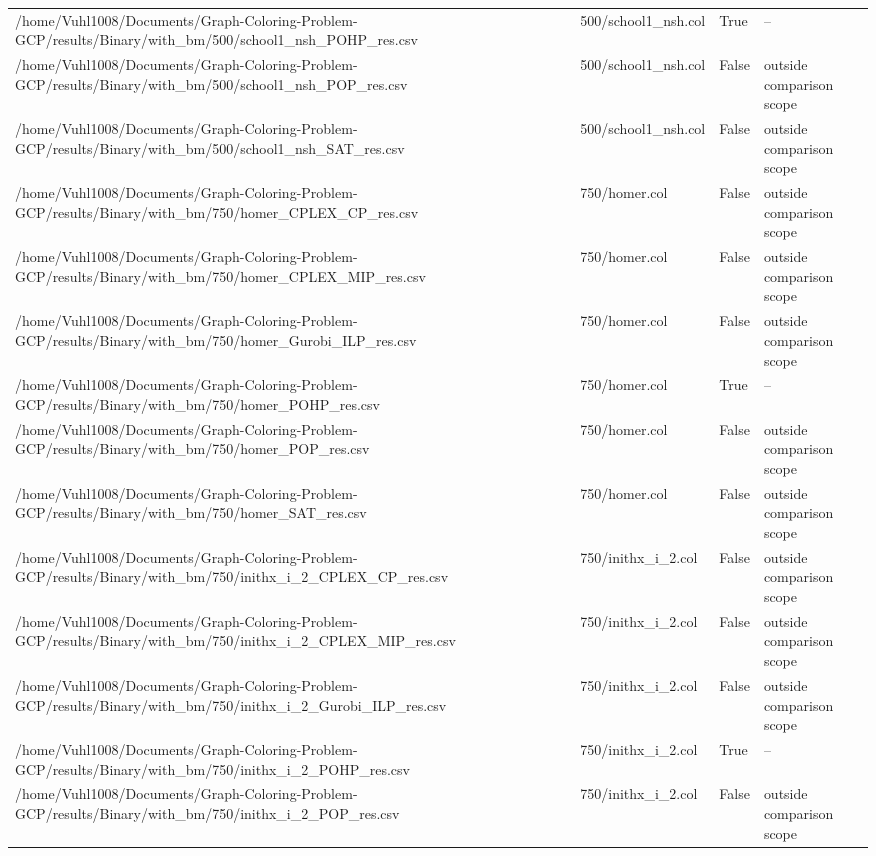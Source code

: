 \begin{table}[htbp]
\begin{tabular}{llll}
/home/Vuhl1008/Documents/Graph-Coloring-Problem-GCP/results/Binary/with\_bm/500/school1\_nsh\_POHP\_res.csv & 500/school1\_nsh.col & True & -- \\
/home/Vuhl1008/Documents/Graph-Coloring-Problem-GCP/results/Binary/with\_bm/500/school1\_nsh\_POP\_res.csv & 500/school1\_nsh.col & False & outside comparison scope \\
/home/Vuhl1008/Documents/Graph-Coloring-Problem-GCP/results/Binary/with\_bm/500/school1\_nsh\_SAT\_res.csv & 500/school1\_nsh.col & False & outside comparison scope \\
/home/Vuhl1008/Documents/Graph-Coloring-Problem-GCP/results/Binary/with\_bm/750/homer\_CPLEX\_CP\_res.csv & 750/homer.col & False & outside comparison scope \\
/home/Vuhl1008/Documents/Graph-Coloring-Problem-GCP/results/Binary/with\_bm/750/homer\_CPLEX\_MIP\_res.csv & 750/homer.col & False & outside comparison scope \\
/home/Vuhl1008/Documents/Graph-Coloring-Problem-GCP/results/Binary/with\_bm/750/homer\_Gurobi\_ILP\_res.csv & 750/homer.col & False & outside comparison scope \\
/home/Vuhl1008/Documents/Graph-Coloring-Problem-GCP/results/Binary/with\_bm/750/homer\_POHP\_res.csv & 750/homer.col & True & -- \\
/home/Vuhl1008/Documents/Graph-Coloring-Problem-GCP/results/Binary/with\_bm/750/homer\_POP\_res.csv & 750/homer.col & False & outside comparison scope \\
/home/Vuhl1008/Documents/Graph-Coloring-Problem-GCP/results/Binary/with\_bm/750/homer\_SAT\_res.csv & 750/homer.col & False & outside comparison scope \\
/home/Vuhl1008/Documents/Graph-Coloring-Problem-GCP/results/Binary/with\_bm/750/inithx\_i\_2\_CPLEX\_CP\_res.csv & 750/inithx\_i\_2.col & False & outside comparison scope \\
/home/Vuhl1008/Documents/Graph-Coloring-Problem-GCP/results/Binary/with\_bm/750/inithx\_i\_2\_CPLEX\_MIP\_res.csv & 750/inithx\_i\_2.col & False & outside comparison scope \\
/home/Vuhl1008/Documents/Graph-Coloring-Problem-GCP/results/Binary/with\_bm/750/inithx\_i\_2\_Gurobi\_ILP\_res.csv & 750/inithx\_i\_2.col & False & outside comparison scope \\
/home/Vuhl1008/Documents/Graph-Coloring-Problem-GCP/results/Binary/with\_bm/750/inithx\_i\_2\_POHP\_res.csv & 750/inithx\_i\_2.col & True & -- \\
/home/Vuhl1008/Documents/Graph-Coloring-Problem-GCP/results/Binary/with\_bm/750/inithx\_i\_2\_POP\_res.csv & 750/inithx\_i\_2.col & False & outside comparison scope \\

\end{tabular}
\end{table}
